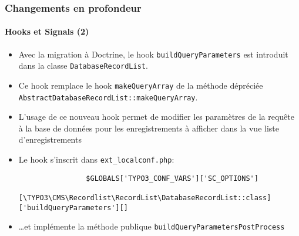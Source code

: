 \begin{frame}[fragile]
	\frametitle{Changements en profondeur}
	\framesubtitle{Hooks et Signals (2)}

	\lstset{basicstyle=\tiny\ttfamily}

	\begin{itemize}

		\item Avec la migration à Doctrine, le hook \texttt{buildQueryParameters} est introduit dans la classe
			\texttt{DatabaseRecordList}.

		\item Ce hook remplace le hook \texttt{makeQueryArray} de la méthode dépréciée
			\texttt{AbstractDatabaseRecordList::makeQueryArray}.

		\item L'usage de ce nouveau hook permet de modifier les paramètres de la requête à la base de données
		 	pour les enregistrements à afficher dans la vue liste d'enregistrements

		\item Le hook s'inscrit dans \texttt{ext\_localconf.php}:

			\begin{lstlisting}
				$GLOBALS['TYPO3_CONF_VARS']['SC_OPTIONS']
				  [\TYPO3\CMS\Recordlist\RecordList\DatabaseRecordList::class]['buildQueryParameters'][]
			\end{lstlisting}

		\item …et implémente la méthode publique \texttt{buildQueryParametersPostProcess}

	\end{itemize}

\end{frame}

